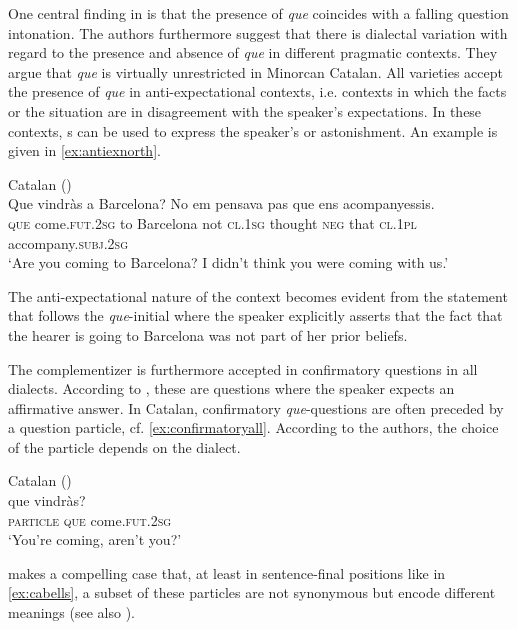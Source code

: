 One central finding in \citet{PrietoRigau2007} is that the presence of \emph{que} coincides with a falling question intonation. The authors furthermore suggest that there is dialectal  variation  with regard to the presence and absence of \emph{que} in  different pragmatic contexts. They argue that \emph{que} is  virtually unrestricted in Minorcan Catalan.  All  varieties accept the presence of \emph{que} in anti-expectational contexts, i.e. contexts in which the facts or the situation are in disagreement with the speaker's expectations. In these contexts, s can  be used to express the speaker's  or astonishment. An example is given in \eqref{ex:antiexnorth}.

\ea\label{ex:antiexnorth}
Catalan (\citealt[15: ex 30a]{PrietoRigau2007})\\
	\gll Que vindràs a Barcelona? No em pensava pas que ens acompanyessis. \\
	\textsc{que} {come}.\textsc{fut.2sg} to Barcelona not \textsc{cl.1sg} thought \textsc{neg} that \textsc{cl.1pl} accompany.\textsc{subj.2sg}\\
	\glt `Are you coming to Barcelona? I didn’t think you were coming with us.'
\z

The anti-expectational nature of the context becomes evident from the statement that follows the \emph{que}-initial   where the speaker explicitly asserts that the fact that the hearer is going to Barcelona was not part of her prior beliefs. 

The complementizer is furthermore accepted  in confirmatory questions in all dialects. According to \citet{PrietoRigau2007}, these are questions where the speaker expects an affirmative answer. In Catalan, confirmatory \emph{que}-questions are often preceded by a question particle, cf. \eqref{ex:confirmatoryall}. According to the authors, the choice of the particle depends on the dialect. 

\ea\label{ex:confirmatoryall}
Catalan (\citealt[17: 35 a-f]{PrietoRigau2007})\\
	 que vindràs? \\
	\textsc{particle} \textsc{que} {come}.\textsc{fut.2sg}\\
	\glt `You're coming, aren't you?'
\z

\citet{Castroviejo2018} makes a compelling case that, at least in sentence-final positions like in \eqref{ex:cabells}, a subset of these particles are not synonymous but encode different meanings (see also ).
 
